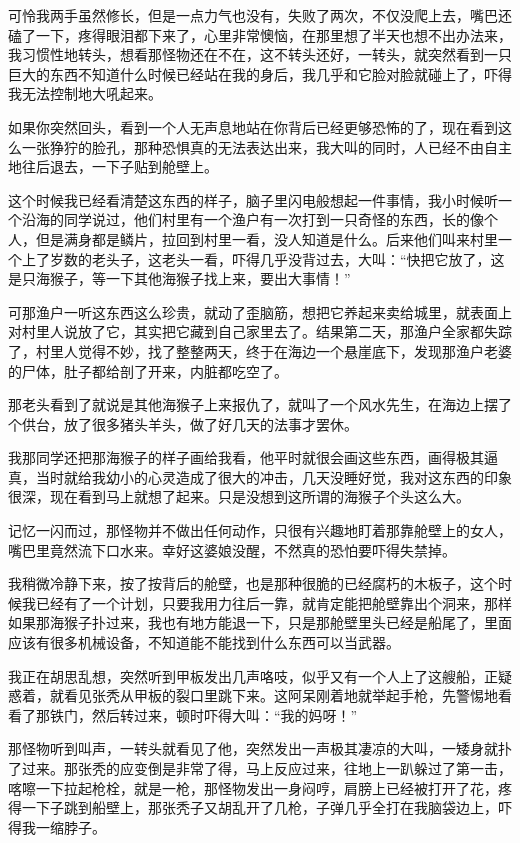 可怜我两手虽然修长，但是一点力气也没有，失败了两次，不仅没爬上去，嘴巴还磕了一下，疼得眼泪都下来了，心里非常懊恼，在那里想了半天也想不出办法来，我习惯性地转头，想看那怪物还在不在，这不转头还好，一转头，就突然看到一只巨大的东西不知道什么时候已经站在我的身后，我几乎和它脸对脸就碰上了，吓得我无法控制地大吼起来。

如果你突然回头，看到一个人无声息地站在你背后已经更够恐怖的了，现在看到这么一张狰狞的脸孔，那种恐惧真的无法表达出来，我大叫的同时，人已经不由自主地往后退去，一下子贴到舱壁上。

这个时候我已经看清楚这东西的样子，脑子里闪电般想起一件事情，我小时候听一个沿海的同学说过，他们村里有一个渔户有一次打到一只奇怪的东西，长的像个人，但是满身都是鳞片，拉回到村里一看，没人知道是什么。后来他们叫来村里一个上了岁数的老头子，这老头一看，吓得几乎没背过去，大叫：“快把它放了，这是只海猴子，等一下其他海猴子找上来，要出大事情！”

可那渔户一听这东西这么珍贵，就动了歪脑筋，想把它养起来卖给城里，就表面上对村里人说放了它，其实把它藏到自己家里去了。结果第二天，那渔户全家都失踪了，村里人觉得不妙，找了整整两天，终于在海边一个悬崖底下，发现那渔户老婆的尸体，肚子都给剖了开来，内脏都吃空了。

那老头看到了就说是其他海猴子上来报仇了，就叫了一个风水先生，在海边上摆了个供台，放了很多猪头羊头，做了好几天的法事才罢休。

我那同学还把那海猴子的样子画给我看，他平时就很会画这些东西，画得极其逼真，当时就给我幼小的心灵造成了很大的冲击，几天没睡好觉，我对这东西的印象很深，现在看到马上就想了起来。只是没想到这所谓的海猴子个头这么大。

记忆一闪而过，那怪物并不做出任何动作，只很有兴趣地盯着那靠舱壁上的女人，嘴巴里竟然流下口水来。幸好这婆娘没醒，不然真的恐怕要吓得失禁掉。

我稍微冷静下来，按了按背后的舱壁，也是那种很脆的已经腐朽的木板子，这个时候我已经有了一个计划，只要我用力往后一靠，就肯定能把舱壁靠出个洞来，那样如果那海猴子扑过来，我也有地方能退一下，只是那舱壁里头已经是船尾了，里面应该有很多机械设备，不知道能不能找到什么东西可以当武器。

我正在胡思乱想，突然听到甲板发出几声咯吱，似乎又有一个人上了这艘船，正疑惑着，就看见张秃从甲板的裂口里跳下来。这阿呆刚着地就举起手枪，先警惕地看看了那铁门，然后转过来，顿时吓得大叫：“我的妈呀！”

那怪物听到叫声，一转头就看见了他，突然发出一声极其凄凉的大叫，一矮身就扑了过来。那张秃的应变倒是非常了得，马上反应过来，往地上一趴躲过了第一击，喀嚓一下拉起枪栓，就是一枪，那怪物发出一身闷哼，肩膀上已经被打开了花，疼得一下子跳到船壁上，那张秃子又胡乱开了几枪，子弹几乎全打在我脑袋边上，吓得我一缩脖子。

